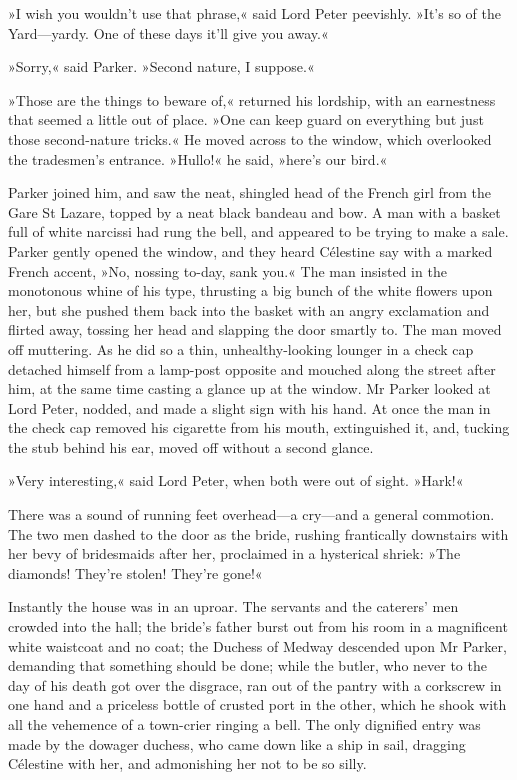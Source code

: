 »I wish you wouldn't use that phrase,« said Lord Peter peevishly. »It's so of the Yard—yardy. One of these days it'll give you away.«

»Sorry,« said Parker. »Second nature, I suppose.«

»Those are the things to beware of,« returned his lordship, with an earnestness that seemed a little out of place. »One can keep guard on everything but just those second-nature tricks.« He moved across to the window, which overlooked the tradesmen's entrance. »Hullo!« he said, »here's our bird.«

Parker joined him, and saw the neat, shingled head of the French girl from the Gare St Lazare, topped by a neat black bandeau and bow. A man with a basket full of white narcissi had rung the bell, and appeared to be trying to make a sale. Parker gently opened the window, and they heard Célestine say with a marked French accent, »No, nossing to-day, sank you.« The man insisted in the monotonous whine of his type, thrusting a big bunch of the white flowers upon her, but she pushed them back into the basket with an angry exclamation and flirted away, tossing her head and slapping the door smartly to. The man moved off muttering. As he did so a thin, unhealthy-looking lounger in a check cap detached himself from a lamp-post opposite and mouched along the street after him, at the same time casting a glance up at the window. Mr Parker looked at Lord Peter, nodded, and made a slight sign with his hand. At once the man in the check cap removed his cigarette from his mouth, extinguished it, and, tucking the stub behind his ear, moved off without a second glance.

»Very interesting,« said Lord Peter, when both were out of sight. »Hark!«

There was a sound of running feet overhead—a cry—and a general commotion. The two men dashed to the door as the bride, rushing frantically downstairs with her bevy of bridesmaids after her, proclaimed in a hysterical shriek: »The diamonds! They're stolen! They're gone!«

Instantly the house was in an uproar. The servants and the caterers' men crowded into the hall; the bride's father burst out from his room in a magnificent white waistcoat and no coat; the Duchess of Medway descended upon Mr Parker, demanding that something should be done; while the butler, who never to the day of his death got over the disgrace, ran out of the pantry with a corkscrew in one hand and a priceless bottle of crusted port in the other, which he shook with all the vehemence of a town-crier ringing a bell. The only dignified entry was made by the dowager duchess, who came down like a ship in sail, dragging Célestine with her, and admonishing her not to be so silly.

